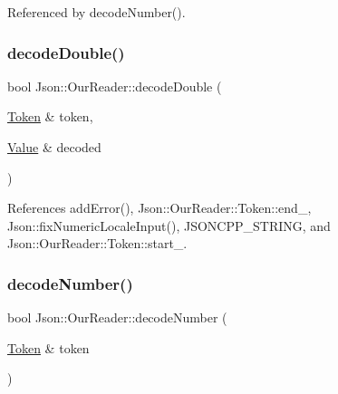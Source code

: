 Referenced by decode\+Number().

\mbox{\label{classJson_1_1OurReader_aa5c15a8cd32754f07430dedba3d1308e_aa5c15a8cd32754f07430dedba3d1308e}} 
\subsubsection{\texorpdfstring{decode\+Double()}{decodeDouble()}\hspace{0.1cm}{\footnotesize\ttfamily [2/2]}}
{\footnotesize\ttfamily bool Json\+::\+Our\+Reader\+::decode\+Double (\begin{DoxyParamCaption}\item[{\hyperlink{classJson_1_1OurReader_1_1Token}{Token} \&}]{token,  }\item[{\hyperlink{classJson_1_1Value}{Value} \&}]{decoded }\end{DoxyParamCaption})\hspace{0.3cm}{\ttfamily [private]}}



References add\+Error(), Json\+::\+Our\+Reader\+::\+Token\+::end\+\_\+, Json\+::fix\+Numeric\+Locale\+Input(), J\+S\+O\+N\+C\+P\+P\+\_\+\+S\+T\+R\+I\+NG, and Json\+::\+Our\+Reader\+::\+Token\+::start\+\_\+.

\mbox{\label{classJson_1_1OurReader_a272d271290933a89abfd5096dd69c9e9_a272d271290933a89abfd5096dd69c9e9}} 
\subsubsection{\texorpdfstring{decode\+Number()}{decodeNumber()}\hspace{0.1cm}{\footnotesize\ttfamily [1/2]}}
{\footnotesize\ttfamily bool Json\+::\+Our\+Reader\+::decode\+Number (\begin{DoxyParamCaption}\item[{\hyperlink{classJson_1_1OurReader_1_1Token}{Token} \&}]{token }\end{DoxyParamCaption})\hspace{0.3cm}{\ttfamily [private]}}



